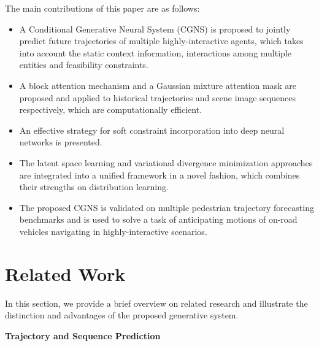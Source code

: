 \documentclass[letterpaper, 10 pt, conference]{ieeeconf}
\begin{document}
The main contributions of this paper are as follows:
\begin{itemize}
	\item A Conditional Generative Neural System (CGNS) is proposed to jointly predict future trajectories of multiple highly-interactive agents, which takes into account the static context information, interactions among multiple entities and feasibility constraints.
	\item A block attention mechanism and a Gaussian mixture attention mask are proposed and applied to historical trajectories and scene image sequences respectively, which are computationally efficient.
	\item An effective strategy for soft constraint incorporation into deep neural networks is presented.
	\item The latent space learning and variational divergence minimization approaches are integrated into a unified framework in a novel fashion, which combines their strengths on distribution learning. 
	\item The proposed CGNS is validated on multiple pedestrian trajectory forecasting benchmarks and is used to solve a task of anticipating motions of on-road vehicles navigating in highly-interactive scenarios.
\end{itemize} 


\section{Related Work}
In this section, we provide a brief overview on related research and illustrate the distinction and advantages of the proposed generative system.
\vspace{0.1cm}

\noindent
\textbf{Trajectory and Sequence Prediction}
\end{document}
